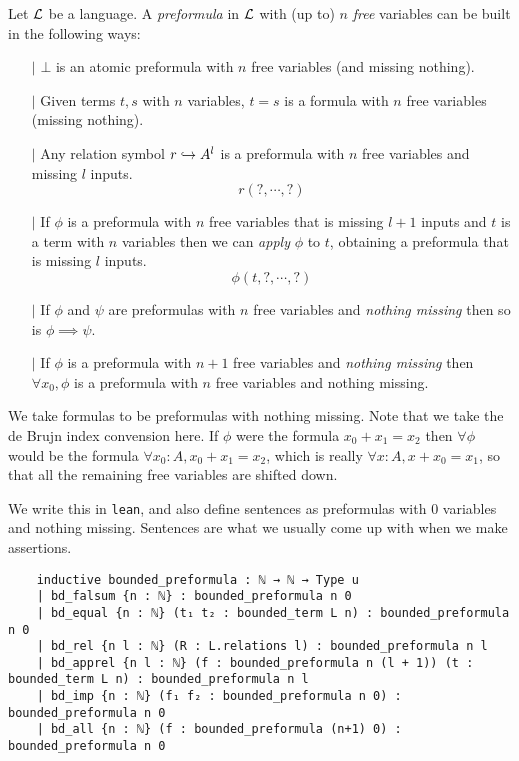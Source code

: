 \begin{dfn}[Formulas]
  Let $\mathcal{L}$ be a language.
  A \textit{preformula} in $\mathcal{L}$ with (up to) $n$ \textit{free} variables
  can be built in the following ways:
  \begin{itemize}
    \item[$\vert$] $\bot$ is an atomic preformula with $n$ free variables
          (and missing nothing).
    \item[$\vert$]
          Given terms $t, s$ with $n$ variables,
          $t = s$ is a formula with $n$ free variables (missing nothing).
    \item[$\vert$] Any relation symbol $r \hookrightarrow A^{l}$ is a preformula
          with $n$ free variables and missing $l$ inputs.
          \[ r (?, \cdots, ?)\]
    \item[$\vert$] If $\phi$ is a preformula with $n$ free variables that is missing
          $l + 1$ inputs and $t$ is a term with $n$ variables
          then we can \textit{apply} $\phi$ to $t$, obtaining
          a preformula that is missing $l$ inputs.
          \[ \phi(t , ? , \cdots, ? )\]
    \item[$\vert$] If $\phi$ and $\psi$ are preformulas with $n$ free variables
          and \textit{nothing missing} then so is $\phi \implies \psi$.
    \item[$\vert$] If $\phi$ is a preformula with $n + 1$ free variables
          and \textit{nothing missing} then $\forall x_{0}, \phi$ is a preformula
          with $n$ free variables and nothing missing.
  \end{itemize}

  We take formulas to be preformulas with nothing missing.
  Note that we take the de Brujn index convension here.
  If $\phi$ were the formula $x_{0} + x_{1} = x_{2}$ then $\forall \phi$ would be
  the formula $\forall x_{0} : A, x_{0} + x_{1} = x_{2}$,
  which is really $\forall x : A, x + x_{0} = x_{1}$,
  so that all the remaining free variables are shifted down.

  We write this in \texttt{lean},
  and also define sentences as preformulas with $0$ variables and nothing missing.
  Sentences are what we usually come up with when we make assertions.

  \begin{lstlisting}
    inductive bounded_preformula : ℕ → ℕ → Type u
    | bd_falsum {n : ℕ} : bounded_preformula n 0
    | bd_equal {n : ℕ} (t₁ t₂ : bounded_term L n) : bounded_preformula n 0
    | bd_rel {n l : ℕ} (R : L.relations l) : bounded_preformula n l
    | bd_apprel {n l : ℕ} (f : bounded_preformula n (l + 1)) (t : bounded_term L n) : bounded_preformula n l
    | bd_imp {n : ℕ} (f₁ f₂ : bounded_preformula n 0) : bounded_preformula n 0
    | bd_all {n : ℕ} (f : bounded_preformula (n+1) 0) : bounded_preformula n 0


\end{lstlisting}
\end{dfn}
